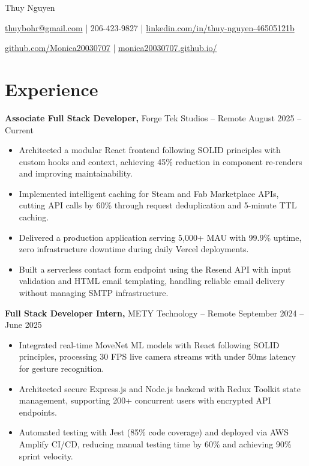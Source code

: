 \documentclass[11pt]{article}       %
\begin{document}
\centerline{\Huge Thuy Nguyen}

\vspace{5pt}

\centerline{\href{mailto:thuybohr@gmail.com}{thuybohr@gmail.com} | 206-423-9827 |
\href{https://www.linkedin.com/in/thuy-nguyen-46505121b/}{linkedin.com/in/thuy-nguyen-46505121b}}

\centerline{\href{https://github.com/Monica20030707}{github.com/Monica20030707} | 
\href{https://monica20030707.github.io/}{monica20030707.github.io/}} 

\vspace{-9pt}

\section*{Experience}

\textbf{Associate Full Stack Developer,} {Forge Tek Studios} -- Remote \hfill August 2025 -- Current \\
\vspace{-9pt}
\begin{itemize}
  \item Architected a modular React frontend following SOLID principles with custom hooks and context, achieving 45\% reduction in component re-renders and improving maintainability.
  \item Implemented intelligent caching for Steam and Fab Marketplace APIs, cutting API calls by 60\% through request deduplication and 5-minute TTL caching.
  \item Delivered a production application serving 5,000+ MAU with 99.9\% uptime, zero infrastructure downtime during daily Vercel deployments.
  \item Built a serverless contact form endpoint using the Resend API with input validation and HTML email templating, handling reliable email delivery without managing SMTP infrastructure.
\end{itemize}

\textbf{Full Stack Developer Intern,} {METY Technology} -- Remote \hfill September 2024 -- June 2025 \\
\vspace{-9pt}
\begin{itemize}
  \item Integrated real-time MoveNet ML models with React following SOLID principles, processing 30 FPS live camera streams with under 50ms latency for gesture recognition.
  \item Architected secure Express.js and Node.js backend with Redux Toolkit state management, supporting 200+ concurrent users with encrypted API endpoints.
  \item Automated testing with Jest (85\% code coverage) and deployed via AWS Amplify CI/CD, reducing manual testing time by 60\% and achieving 90\% sprint velocity.
\end{itemize}
\end{document}
